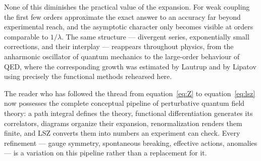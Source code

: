 \documentclass[twocolumn]{article}
\begin{document}
None of this diminishes the practical value of the expansion. For weak
coupling the first few orders approximate the exact answer to an
accuracy far beyond experimental reach, and the asymptotic character
only becomes visible at orders comparable to $1/\lambda$. The same
structure --- divergent series, exponentially small corrections, and
their interplay --- reappears throughout physics, from the anharmonic
oscillator of quantum mechanics to the large-order behaviour of QED,
where the corresponding growth was estimated by Lautrup and by Lipatov
using precisely the functional methods rehearsed here.

The reader who has followed the thread from equation~\eqref{eq:Z} to
equation~\eqref{eq:lsz} now possesses the complete conceptual pipeline
of perturbative quantum field theory: a path integral defines the
theory, functional differentiation generates its correlators, diagrams
organize their expansion, renormalization renders them finite, and LSZ
converts them into numbers an experiment can check. Every refinement
--- gauge symmetry, spontaneous breaking, effective actions, anomalies
--- is a variation on this pipeline rather than a replacement for it.
\end{document}
